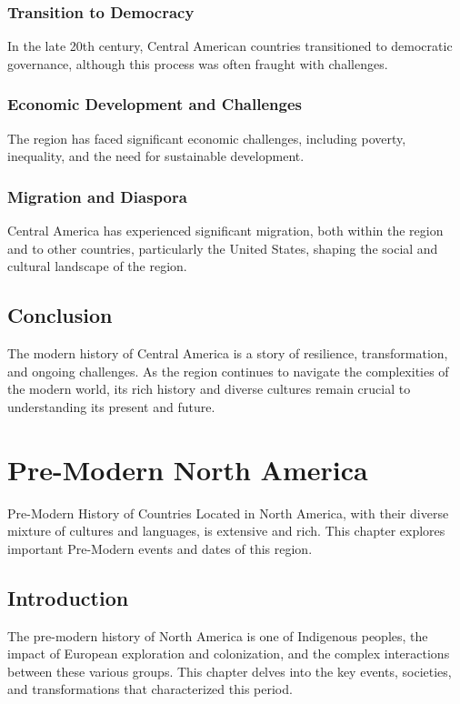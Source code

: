 \documentclass[a4paper,12pt]{book}
\begin{document}
\subsection{Transition to Democracy}
\label{subsec:transition-democracy}
In the late 20th century, Central American countries transitioned to democratic governance, although this process was often fraught with challenges.

\subsection{Economic Development and Challenges}
\label{subsec:economic-development-challenges}
The region has faced significant economic challenges, including poverty, inequality, and the need for sustainable development.

\subsection{Migration and Diaspora}
\label{subsec:migration-diaspora}
Central America has experienced significant migration, both within the region and to other countries, particularly the United States, shaping the social and cultural landscape of the region.

\section{Conclusion}
\label{sec:conclusion-modern-central-america}
The modern history of Central America is a story of resilience, transformation, and ongoing challenges. As the region continues to navigate the complexities of the modern world, its rich history and diverse cultures remain crucial to understanding its present and future.

\chapter{Pre-Modern North America}
\label{ch:pre-modern-history-north-america}

Pre-Modern History of Countries Located in North America, with their diverse mixture of cultures and languages, is extensive and rich. This chapter explores important Pre-Modern events and dates of this region.

\section{Introduction}
\label{sec:introduction-north-america}
The pre-modern history of North America is one of Indigenous peoples, the impact of European exploration and colonization, and the complex interactions between these various groups. This chapter delves into the key events, societies, and transformations that characterized this period.
\end{document}
